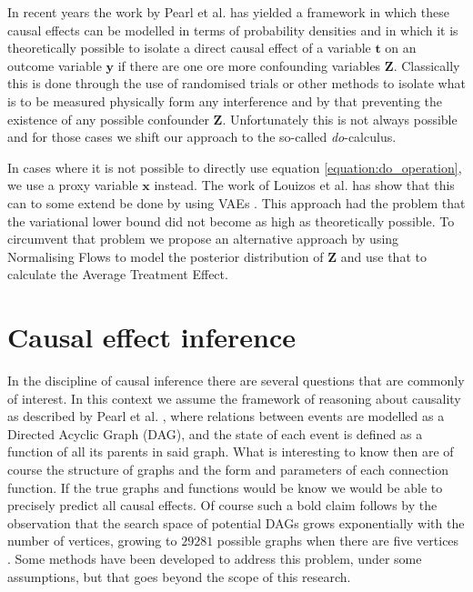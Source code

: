 \documentclass{report}
\newcommand{\bt}{\mathbf{t}}
\newcommand{\bx}{\mathbf{x}}
\newcommand{\by}{\mathbf{y}}
\newcommand{\bZ}{\mathbf{Z}}
\begin{document}
In recent years the work by Pearl et al.\cite{pearl2009causal} \cite{pearl1995causal} has yielded a framework in which these causal effects can be modelled in terms of probability densities and in which it is theoretically possible to isolate a direct causal effect of a variable $\bt$ on an outcome variable $\by$ if there are one ore more confounding variables $\bZ$. Classically this is done through the use of randomised trials or other methods to isolate what is to be measured physically form any interference and by that preventing the existence of any possible confounder $\bZ$. Unfortunately this is not always possible and for those cases we shift our approach to the so-called \textit{do}-calculus. 

In cases where it is not possible to directly use equation \ref{equation:do_operation}, we use a proxy variable $\bx$ instead. The work of Louizos et al. \cite{louizos2017causal} has show that this can to some extend be done by using VAEs \cite{kingma2013auto}. This approach had the problem that the variational lower bound did not become as high as theoretically possible. To circumvent that problem we propose an alternative approach by using Normalising Flows \cite{rezende2016variational} to model the posterior distribution of $\bZ$ and use that to calculate the Average Treatment Effect.


\chapter{Causal effect inference}
In the discipline of causal inference there are several questions that are commonly of interest. In this context we assume the framework of reasoning about causality as described by Pearl et al. \cite{pearl2009causal}, where relations between events are modelled as a Directed Acyclic Graph (DAG), and the state of each event is defined as a function of all its parents in said graph. What is interesting to know then are of course the structure of graphs and the form and parameters of each connection function. If the true graphs and functions would be know we would be able to precisely predict all causal effects. Of course such a bold claim follows by the observation that the search space of potential DAGs grows exponentially with the number of vertices, growing to $29281$ possible graphs when there are five vertices \cite{robinson1977counting}. Some methods have been developed to address this problem, under some assumptions, but that goes beyond the scope of this research.
\end{document}
